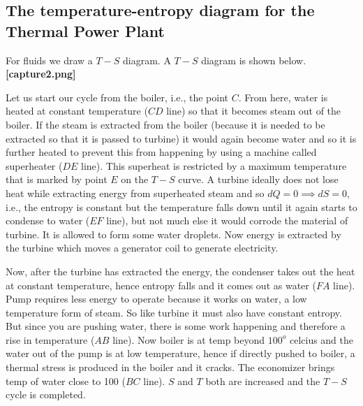 \documentclass{report}
\begin{document}
\subsection{The temperature-entropy diagram for the Thermal Power Plant}
For fluids we draw a $T-S$ diagram. A $T-S$ diagram is shown below. 
\\
{\bf [capture2.png]}
\par Let us start our cycle from the boiler, i.e., the point $C$. From here, water is heated at constant temperature ($CD$ line) so that it becomes steam out of the boiler. If the steam is extracted from the boiler (because it is needed to be extracted so that it is passed to turbine) it would again become water and so it is further heated to prevent this from happening by using a machine called superheater ($DE$ line). This superheat is restricted by a maximum temperature that is marked by point $E$ on the $T-S$ curve.  A turbine ideally does not lose heat while extracting energy from superheated steam and so $dQ = 0 \implies dS = 0$, i.e., the entropy is constant but the temperature falls down until it again starts to condense to water ($EF$ line), but not much else it would corrode the material of turbine. It is allowed to form some water droplets. Now energy is extracted by the turbine which moves a generator coil to generate electricity.

\par Now, after the turbine has extracted the energy, the condenser takes out the heat at constant temperature, hence entropy falls and it comes out as water ($FA$ line). Pump requires less energy to operate because it works on water, a low temperature form of steam. So like turbine it must also have constant entropy. But since you are pushing water, there is some work happening and therefore a rise in temperature ($AB$ line). Now boiler is at temp beyond $100^{o}$ celcius and the water out of the pump is at low temperature, hence if directly pushed to boiler, a thermal stress is produced in the boiler and it cracks.  The economizer brings temp of water close to 100 ($BC$ line). $S$ and $T$ both are increased and the $T-S$ cycle is completed.
\end{document}
